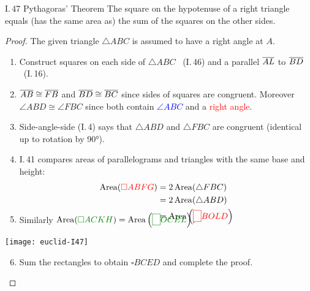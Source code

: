 \begin{thm}{I.\,47 Pythagoras' Theorem}{}
	The square on the hypotenuse of a right triangle equals (has the same area as) the sum of the squares on the other sides.
\end{thm}

\begin{proof} 
	The given triangle $\triangle ABC$ is assumed to have a right angle at $A$.\par
	\begin{minipage}[t]{0.6\linewidth}\vspace{0pt}
	\begin{enumerate}\itemsep0pt
	  \item Construct squares on each side of $\triangle ABC$ \ (I.\,46) and a parallel $\overline{AL}$ to $\overline{BD}$ \ (I.\,16).
	  \item $\overline{AB}\cong\overline{FB}$ and $\overline{BD}\cong\overline{BC}$ since sides of squares are congruent. Moreover $\angle ABD\cong\angle FBC$ since both contain \textcolor{blue}{$\angle ABC$} and a \textcolor{red}{right angle}.
	  \item Side-angle-side (I.\,4) says that $\triangle ABD$ and $\triangle FBC$ are congruent (identical up to rotation by \ang{90}).
		\item I.\,41 compares areas of parallelograms and triangles with the same base and height:\vspace{0pt}
		\begin{align*}
			\operatorname{Area}(\textcolor{red}{\square ABFG})&=2\operatorname{Area}(\triangle FBC)\\
			&=2\operatorname{Area}(\triangle ABD)\\
			&=\operatorname{Area}\left(\textcolor{red}{\fbox{\phantom{'}}BOLD}\right)\\[-25pt]
		\end{align*}
		\item Similarly $\operatorname{Area}(\textcolor{Green}{\square ACKH}) =\operatorname{Area}\left(\textcolor{Green}{\fbox{\phantom{'}}OCEL}\right)$.
	\end{enumerate}
	\end{minipage}
	\hfill
	\begin{minipage}[t]{0.39\linewidth}\vspace{0pt}
		\flushright
		\texttt{[image: euclid-I47]}
	\end{minipage}
	\begin{enumerate}\setcounter{enumi}{5}
		\item Sum the rectangles to obtain $\square BCED$ and complete the proof.\hfill\qedhere
	\end{enumerate}
\end{proof}



